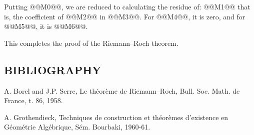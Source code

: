 Putting
@@M0@@, we are reduced to calculating the residue of:
@@M1@@
that is, the coefficient of @@M2@@ in @@M3@@. For @@M4@@, it is zero, and for @@M5@@, it is @@M6@@.

This completes the proof of the Riemann--Roch theorem.

\subsection*{BIBLIOGRAPHY}
\begin{enumerate}[label={[\arabic*]}]
\item A. Borel and J.P. Serre, Le théorème de Riemann--Roch, Bull. Soc. Math. de France, t. 86, 1958.
\item A. Grothendieck, Techniques de construction et théorèmes d'existence en Géométrie Algébrique, Sém. Bourbaki, 1960-61.
\end{enumerate}

